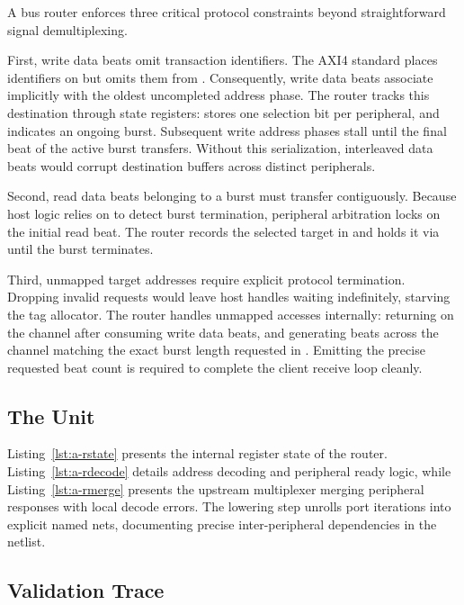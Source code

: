 \documentclass[journal,9pt]{IEEEtran}
\begin{document}
A bus router enforces three critical protocol constraints beyond
straightforward signal demultiplexing.

First, write data beats omit transaction identifiers. The AXI4 standard
places identifiers on  but omits them from . Consequently,
write data beats associate implicitly with the oldest uncompleted address
phase. The router tracks this destination through state registers:
 stores one selection bit per peripheral, and 
indicates an ongoing burst. Subsequent write address phases stall until the
final beat of the active burst transfers. Without this serialization,
interleaved data beats would corrupt destination buffers across distinct
peripherals.

Second, read data beats belonging to a burst must transfer contiguously.
Because host logic relies on  to detect burst termination,
peripheral arbitration locks on the initial read beat. The router records the
selected target in  and holds it via  until the burst
terminates.

Third, unmapped target addresses require explicit protocol termination.
Dropping invalid requests would leave host handles waiting indefinitely,
starving the tag allocator. The router handles unmapped accesses internally:
returning  on the  channel after consuming write data
beats, and generating  beats across the  channel matching
the exact burst length requested in . Emitting the precise
requested beat count is required to complete the client receive loop
cleanly.

\subsection*{The Unit}

Listing~\ref{lst:a-rstate} presents the internal register state of the
router. Listing~\ref{lst:a-rdecode} details address decoding and peripheral
ready logic, while Listing~\ref{lst:a-rmerge} presents the upstream
multiplexer merging peripheral responses with local decode errors. The
lowering step unrolls port iterations into explicit named nets, documenting
precise inter-peripheral dependencies in the netlist.

\subsection*{Validation Trace}
\end{document}
